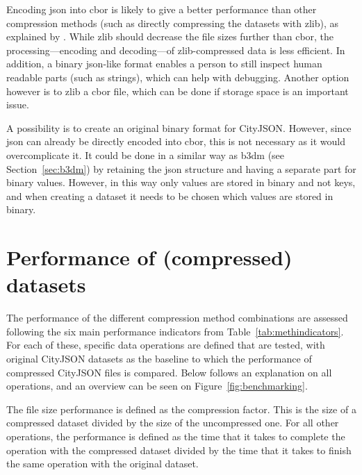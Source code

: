 Encoding \ac{json} into \ac{cbor} is likely to give a better performance than other compression methods (such as directly compressing the datasets with zlib), as explained by \citet{UBJSON2020}.
While zlib should decrease the file sizes further than \ac{cbor}, the processing---encoding and decoding---of zlib-compressed data is less efficient.
In addition, a binary \ac{json}-like format enables a person to still inspect human readable parts (such as strings), which can help with debugging.
Another option however is to zlib a \ac{cbor} file, which can be done if storage space is an important issue.

A possibility is to create an original binary format for CityJSON.
However, since \ac{json} can already be directly encoded into \ac{cbor}, this is not necessary as it would overcomplicate it.
It could be done in a similar way as b3dm (see Section~\ref{sec:b3dm}) by retaining the \ac{json} structure and having a separate part for binary values.
However, in this way only values are stored in binary and not keys, and when creating a dataset it needs to be chosen which values are stored in binary.

\section{Performance of (compressed) datasets}
\label{sec:methperformance}
The performance of the different compression method combinations are assessed following the six main performance indicators from Table~\ref{tab:methindicators}.
For each of these, specific data operations are defined that are tested, with original CityJSON datasets as the baseline to which the performance of compressed CityJSON files is compared.
Below follows an explanation on all operations, and an overview can be seen on Figure~\ref{fig:benchmarking}.

The file size performance is defined as the compression factor.
This is the size of a compressed dataset divided by the size of the uncompressed one.
For all other operations, the performance is defined as the time that it takes to complete the operation with the compressed dataset divided by the time that it takes to finish the same operation with the original dataset.

